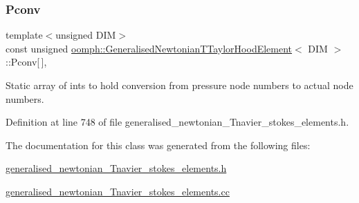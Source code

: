 \subsubsection{\texorpdfstring{Pconv}{Pconv}}
{\footnotesize\ttfamily template$<$unsigned D\+IM$>$ \\
const unsigned \hyperlink{classoomph_1_1GeneralisedNewtonianTTaylorHoodElement}{oomph\+::\+Generalised\+Newtonian\+T\+Taylor\+Hood\+Element}$<$ D\+IM $>$\+::Pconv\mbox{[}$\,$\mbox{]}\hspace{0.3cm}{\ttfamily [static]}, {\ttfamily [protected]}}



Static array of ints to hold conversion from pressure node numbers to actual node numbers. 



Definition at line 748 of file generalised\+\_\+newtonian\+\_\+\+Tnavier\+\_\+stokes\+\_\+elements.\+h.



The documentation for this class was generated from the following files\+:\begin{DoxyCompactItemize}
\item 
\hyperlink{generalised__newtonian__Tnavier__stokes__elements_8h}{generalised\+\_\+newtonian\+\_\+\+Tnavier\+\_\+stokes\+\_\+elements.\+h}\item 
\hyperlink{generalised__newtonian__Tnavier__stokes__elements_8cc}{generalised\+\_\+newtonian\+\_\+\+Tnavier\+\_\+stokes\+\_\+elements.\+cc}\end{DoxyCompactItemize}
